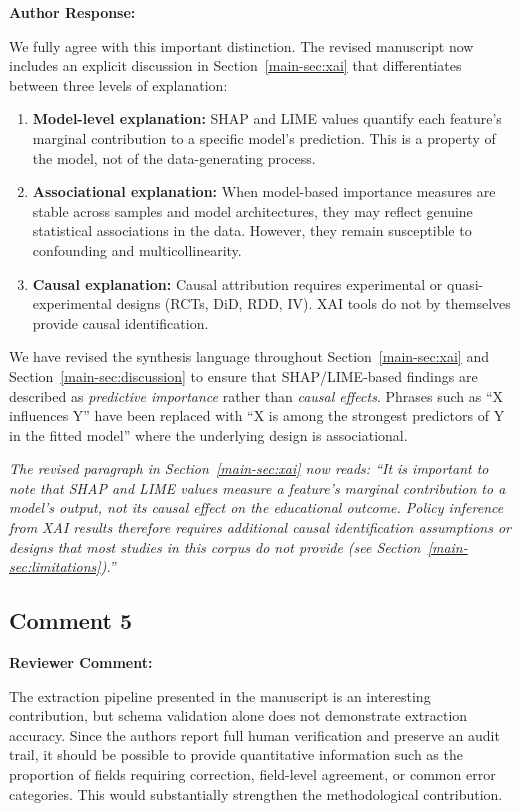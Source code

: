 \documentclass[12pt, a4paper]{article}
\newcommand{\R}[1]{Section~\ref{main-#1}}
\newenvironment{reviewercomment}{%
  \begin{mdframed}[linecolor=reviewercolor, linewidth=1.5pt,
    backgroundcolor=reviewercolor!6, innertopmargin=8pt, innerbottommargin=8pt]
  \color{reviewercolor}\textbf{Reviewer Comment:}\normalcolor\par\smallskip
}{%
  \end{mdframed}\medskip
}
\newenvironment{authorresponse}{%
  \begin{mdframed}[linecolor=authorcolor, linewidth=1pt,
    backgroundcolor=authorcolor!5, innertopmargin=8pt, innerbottommargin=8pt]
  \color{authorcolor}\textbf{Author Response:}\normalcolor\par\smallskip
}{%
  \end{mdframed}\bigskip
}
\newcommand{\changed}[1]{\textcolor{changedcolor}{\textit{#1}}}
\begin{document}
\begin{authorresponse}
We fully agree with this important distinction. The revised manuscript now
includes an explicit discussion in \R{sec:xai} that differentiates between
three levels of explanation:
\begin{enumerate}[leftmargin=*]
  \item \textbf{Model-level explanation:} SHAP and LIME values quantify
    each feature's marginal contribution to a specific model's prediction.
    This is a property of the model, not of the data-generating process.
  \item \textbf{Associational explanation:} When model-based importance
    measures are stable across samples and model architectures, they may
    reflect genuine statistical associations in the data. However, they
    remain susceptible to confounding and multicollinearity.
  \item \textbf{Causal explanation:} Causal attribution requires
    experimental or quasi-experimental designs (RCTs, DiD, RDD, IV).
    XAI tools do not by themselves provide causal identification.
\end{enumerate}

We have revised the synthesis language throughout \R{sec:xai} and
\R{sec:discussion} to ensure that SHAP/LIME-based findings are described
as \textit{predictive importance} rather than \textit{causal effects}.
Phrases such as ``X influences Y'' have been replaced with ``X is among
the strongest predictors of Y in the fitted model'' where the underlying
design is associational.

\changed{The revised paragraph in \R{sec:xai} now reads: ``It is important
to note that SHAP and LIME values measure a feature's marginal contribution
to a model's output, not its causal effect on the educational outcome.
Policy inference from XAI results therefore requires additional causal
identification assumptions or designs that most studies in this corpus
do not provide (see \R{sec:limitations}).''}
\end{authorresponse}

\subsection*{Comment 5}

\begin{reviewercomment}
The extraction pipeline presented in the manuscript is an interesting
contribution, but schema validation alone does not demonstrate extraction
accuracy. Since the authors report full human verification and preserve an
audit trail, it should be possible to provide quantitative information such
as the proportion of fields requiring correction, field-level agreement, or
common error categories. This would substantially strengthen the
methodological contribution.
\end{reviewercomment}
\end{document}
